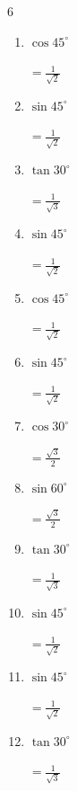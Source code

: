 \begin{multicols}{6}
\begin{enumerate}
        $\displaystyle =\frac{1}{\sqrt{3}}$

  \item $\displaystyle \cos{45^\circ}$

        $\displaystyle =\frac{1}{\sqrt{2}}$

  \item $\displaystyle \sin{45^\circ}$

        $\displaystyle =\frac{1}{\sqrt{2}}$

  \item $\displaystyle \tan{30^\circ}$

        $\displaystyle =\frac{1}{\sqrt{3}}$

  \item $\displaystyle \sin{45^\circ}$

        $\displaystyle =\frac{1}{\sqrt{2}}$

  \item $\displaystyle \cos{45^\circ}$

        $\displaystyle =\frac{1}{\sqrt{2}}$

\columnbreak %

  \item $\displaystyle \sin{45^\circ}$

        $\displaystyle =\frac{1}{\sqrt{2}}$

  \item $\displaystyle \cos{30^\circ}$

        $\displaystyle =\frac{\sqrt{3}}{2}$

  \item $\displaystyle \sin{60^\circ}$

        $\displaystyle =\frac{\sqrt{3}}{2}$

  \item $\displaystyle \tan{30^\circ}$

        $\displaystyle =\frac{1}{\sqrt{3}}$

  \item $\displaystyle \sin{45^\circ}$

        $\displaystyle =\frac{1}{\sqrt{2}}$

  \item $\displaystyle \sin{45^\circ}$

        $\displaystyle =\frac{1}{\sqrt{2}}$

  \item $\displaystyle \tan{30^\circ}$

        $\displaystyle =\frac{1}{\sqrt{3}}$


\end{enumerate}
\end{multicols}

